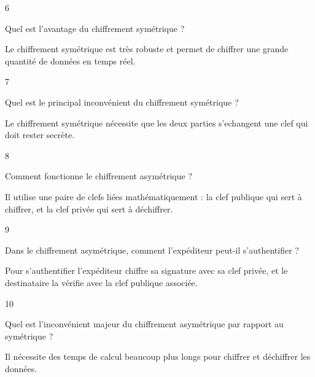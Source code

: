 \begin{taggedblock}{6}
\begin{exoq}
Quel est l'avantage du chiffrement symétrique ?
\end{exoq} 
\begin{exor}
Le chiffrement symétrique est très robuste et permet de chiffrer une grande quantité de données en temps réel. \bqr
\end{exor} 
\end{taggedblock}

\begin{taggedblock}{7}
\begin{exoq}
Quel est le principal inconvénient du chiffrement symétrique ?
\end{exoq} 
\begin{exor}
Le chiffrement symétrique nécessite que les deux parties s'echangent une clef qui doit rester secrète. \bqr
\end{exor} 
\end{taggedblock}

\begin{taggedblock}{8}
\begin{exoq}
Comment fonctionne le chiffrement asymétrique ?
\end{exoq} 
\begin{exor}
Il utilise une paire de clefs liées mathématiquement : la clef publique qui sert à chiffrer, et la clef privée qui sert à déchiffrer. \bqr
\end{exor} 
\end{taggedblock}

\begin{taggedblock}{9}
\begin{exoq}
Dans le chiffrement asymétrique, comment l'expéditeur peut-il s'authentifier ?
\end{exoq} 
\begin{exor}
Pour s'authentifier l'expéditeur chiffre sa signature avec sa clef privée, et le destinataire la vérifie avec la clef publique associée. \bqr
\end{exor} 
\end{taggedblock}

\begin{taggedblock}{10}
\begin{exoq}
Quel est l'inconvénient majeur du chiffrement asymétrique par rapport au symétrique ?
\end{exoq} 
\begin{exor}
Il nécessite des temps de calcul beaucoup plus longs pour chiffrer et déchiffrer les données. \bqr
\end{exor} 
\end{taggedblock}

